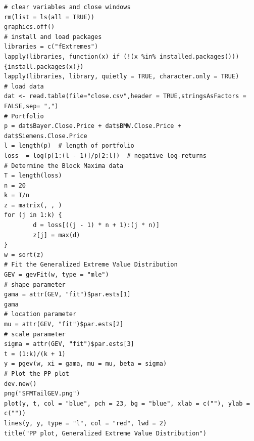 \documentclass[a4paper,11pt]{article}
\begin{document}
\begin{flushleft}
{\linespread{1.5}\selectfont
\begin{lstlisting}
# clear variables and close windows
rm(list = ls(all = TRUE))
graphics.off()
# install and load packages
libraries = c("fExtremes")
lapply(libraries, function(x) if (!(x %in% installed.packages())) {install.packages(x)})
lapply(libraries, library, quietly = TRUE, character.only = TRUE)
# load data
dat <- read.table(file="close.csv",header = TRUE,stringsAsFactors = FALSE,sep= ",")
# Portfolio
p = dat$Bayer.Close.Price + dat$BMW.Close.Price + dat$Siemens.Close.Price
l = length(p)  # length of portfolio
loss  = log(p[1:(l - 1)]/p[2:l])  # negative log-returns
# Determine the Block Maxima data
T = length(loss)
n = 20
k = T/n
z = matrix(, , )
for (j in 1:k) {
        d = loss[((j - 1) * n + 1):(j * n)]
        z[j] = max(d)
}
w = sort(z)
# Fit the Generalized Extreme Value Distribution
GEV = gevFit(w, type = "mle")
# shape parameter
gama = attr(GEV, "fit")$par.ests[1]
gama
# location parameter
mu = attr(GEV, "fit")$par.ests[2]
# scale parameter
sigma = attr(GEV, "fit")$par.ests[3]
t = (1:k)/(k + 1)
y = pgev(w, xi = gama, mu = mu, beta = sigma)
# Plot the PP plot
dev.new()
png("SFMTailGEV.png")
plot(y, t, col = "blue", pch = 23, bg = "blue", xlab = c(""), ylab = c(""))
lines(y, y, type = "l", col = "red", lwd = 2)
title("PP plot, Generalized Extreme Value Distribution")
\end{lstlisting}
}
\end{flushleft}
	
\end{document}
